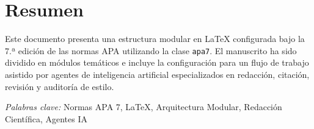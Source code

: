 
\section*{Resumen}

Este documento presenta una estructura modular en \LaTeX{} configurada bajo la 7.ª edición de las normas APA utilizando la clase \texttt{apa7}. El manuscrito ha sido dividido en módulos temáticos e incluye la configuración para un flujo de trabajo asistido por agentes de inteligencia artificial especializados en redacción, citación, revisión y auditoría de estilo.

\indent\textit{Palabras clave:} Normas APA 7, LaTeX, Arquitectura Modular, Redacción Científica, Agentes IA